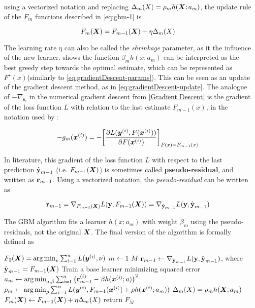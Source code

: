 using a vectorized notation and replacing $\Delta_m(X) =\rho_m h(\bm{X}; a_m)$,  the update rule of the $F_m$ functions described in \ref{eq:gbm-1} is

\begin{equation}
    F_m(\bm{X}) = F_{m-1}(\bm{X}) + \eta \Delta_m(X)
\end{equation}

The learning rate $\eta$ can also be called the \textit{shrinkage} parameter, as it  the influence of the new learner. \cite{gbmdef} shows the function $\beta_mh(x; a_m)$ can be interpreted as the best greedy step towards the optimal estimate, which can be represented as $F^\star(x)$(similarly to \ref{eq:gradientDescent-params}). This can be seen as an update of the gradient descent method, as in \ref{eq:gradientDescent-update}. The analogue of $-\nabla_{\theta_{t}}$ in the numerical gradient descent from \ref{Gradient Descent} is the gradient of the loss function $L$ with relation to the last estimate $F_{m-1}(x)$, in the notation used by \cite{gbmdef}:

\begin{equation*}
    -g_m(\bm{x}^{(i)}) = -\bigg[\frac{\partial L(\bm{y}^{(i)}, F(\bm{x}^{(i)}))}{\partial F(\bm{x}^{(i)})}\bigg]_{F(x)=F_{m-1}(x)}
\end{equation*}

In literature, this gradient of the loss function $L$ with respect to the last prediction $\hat{\textbf{{\text{\textup{y}}}}}_{m-1}$ (i.e. $F_{m-1}(\bm{X})$) is sometimes called \textbf{pseudo-residual}, and written as $\textbf{{\text{\textup{r}}}}_{m-1}$. Using a vectorized notation, the \textit{pseudo-residual} can be written as

\begin{equation*}
    \textbf{{\text{\textup{r}}}}_{m-1} = \nabla_{F_{m-1}(\bm{X})}L(\textbf{\text{\textup{y}}}, F_{m-1}(\bm{X})) = \nabla_{\hat{\textbf{{\text{\textup{y}}}}}_{m-1}}L(\textbf{\text{\textup{y}}},\hat{\textbf{{\text{\textup{y}}}}}_{m-1})
\end{equation*}


The GBM algorithm fits a learner $h(x; a_m)$ with weight $\beta_m$ using the pseudo-residuals, not the original $\bm{X}$. The final version of the algorithm is formally defined as

\begin{codebox}
    \li $F_0(\bm{X}) = \operatorname*{arg\,min}_{\nu}\sum_{i=1}^n L(\bm{y}^{(i)}, \nu)$
    \li \For $m \gets 1$ \To $M$
    \li     \Do
                $\textbf{{\text{\textup{r}}}}_{m-1} \gets \nabla_{\hat{\textbf{{\text{\textup{y}}}}}_{m-1}}L(\textbf{\text{\textup{y}}},\hat{\textbf{{\text{\textup{y}}}}}_{m-1})$, where $\hat{\textbf{{\text{\textup{y}}}}}_{m-1}=F_{m-1}(\bm{X})$
    \li         \Comment Train a base learner minimizing squared error
    \li         $a_m \gets \operatorname*{arg\,min}_{a, \beta}\sum_{i=1}^n\big(\textbf{{\text{\textup{r}}}}_{m-1}^{(i)}-\beta h(\bm{x}^{(i)};a)\big)^2$
    \li         $\rho_m \gets \operatorname*{arg\,min}_{\rho}\sum_{i=1}^n L(\bm{y}^{(i)}, F_{m-1}(\bm{x}^{(i)}) + \rho h(\bm{x}^{(i)};a_m))$
    \li         $\Delta_m(X) =\rho_m h(\bm{X}; a_m)$
    \li         $F_m(\bm{X}) \gets F_{m-1}(\bm{X}) + \eta \Delta_m(X)$
            \End
    \li return $F_M$
    \end{codebox}
    
